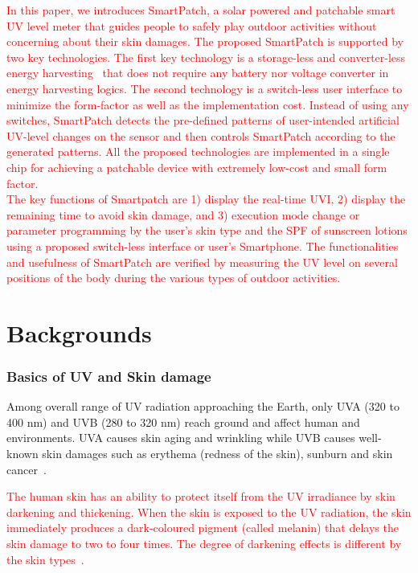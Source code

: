 \documentclass[journal]{IEEEtran}
\begin{document}
\textcolor{red}{In this paper, we introduces SmartPatch, a solar powered  and patchable smart UV level meter that guides people to safely play outdoor activities without concerning about their skin damages. The proposed SmartPatch is supported by two key technologies. The first key technology is a storage-less and converter-less energy harvesting~\cite{Lee:ASPDAC15} that does not require any battery nor voltage converter in energy harvesting logics. The second technology is a switch-less user interface to minimize the form-factor as well as the implementation cost. Instead of using any switches, SmartPatch detects the pre-defined patterns of user-intended artificial UV-level changes on the sensor and then controls SmartPatch according to the generated patterns. All the proposed technologies are implemented in a single chip for achieving a patchable device with extremely low-cost and small form factor.\\
% 
The key functions of Smartpatch are 1) display the real-time UVI, 2) display the remaining time to avoid skin damage, and 3) execution mode change or parameter programming by the user's skin type and the SPF of sunscreen lotions using a proposed switch-less interface or user's Smartphone. The functionalities and usefulness of SmartPatch are verified by measuring the UV level on several positions of the body during the various types of outdoor activities.}

\section{Backgrounds}
\subsubsection{Basics of UV and Skin damage}

Among overall range of UV radiation approaching the Earth, only UVA (320 to 400 nm) and UVB (280 to 320 nm) reach ground and affect human and environments. UVA causes skin aging and wrinkling while UVB causes well-known skin damages such as erythema (redness of the skin), sunburn and skin cancer~\cite{Matsumura:TAP04}.

\textcolor{red}{The human skin has an ability to protect itself from the UV irradiance by skin darkening and thickening.
When the skin is exposed to the UV radiation, the skin immediately produces a dark-coloured pigment (called melanin) that delays the skin damage to two to four times. The degree of darkening effects is different by the skin types~\cite{Harrison:Method02}.}
\end{document}
